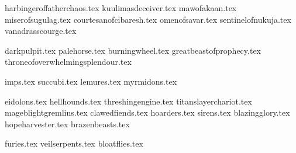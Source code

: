 
{harbingeroffatherchaos.tex}
{kuulimasdeceiver.tex}
{mawofakaan.tex}
{miserofsugulag.tex}
{courtesanofcibaresh.tex}
{omenofsavar.tex}
{sentinelofnukuja.tex}
{vanadrasscourge.tex}

\clearpage
{}
{darkpulpit.tex}
{palehorse.tex}
{burningwheel.tex}
{greatbeastofprophecy.tex}
{throneofoverwhelmingsplendour.tex}

\clearpage
{}
{imps.tex}
{succubi.tex}
{lemures.tex}
{myrmidons.tex}

\clearpage
{}
{eidolons.tex}
{hellhounds.tex}
{threshingengine.tex}
{titanslayerchariot.tex}
{mageblightgremlins.tex}
{clawedfiends.tex}
{hoarders.tex}
{sirens.tex}
{blazingglory.tex}
{hopeharvester.tex}
{brazenbeasts.tex}

\clearpage
{}
{furies.tex}
{veilserpents.tex}
{bloatflies.tex}
